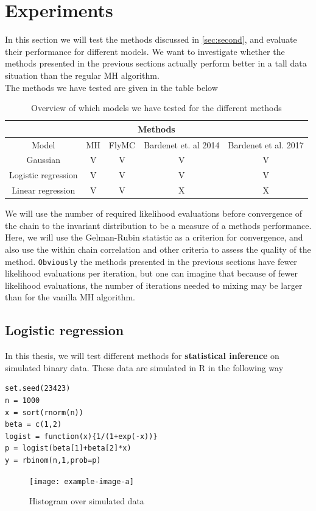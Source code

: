 \chapter{Experiments}\label{chap:experiments}
In this section we will test the methods discussed in \ref{sec:second}, and evaluate their performance for different models. We want to investigate whether the methods presented in the previous sections actually perform better in a tall data situation than the regular MH algorithm.  \\
The methods we have tested are given in the table below 

\begin{table}[H]
    \centering
        \begin{tabular}{|c|c|c|c|c|}
    \hline
    \multicolumn{5}{|c|}{Methods} \\
    \hline
   Model & MH & FlyMC & Bardenet et. al 2014 & Bardenet et al. 2017\\ \hline\hline
        Gaussian & V & V & V &V \\
        Logistic regression &V &V &V &V  \\
        Linear regression &V & V& X& X \\ \hline
    \end{tabular}{}
    \caption{Overview of which models we have tested for the different methods}
    \label{tab:experiment_overview}
\end{table}{}
We will use the number of required likelihood evaluations before convergence of the chain to the invariant distribution to be a measure of a methods performance.
Here, we will use the Gelman-Rubin statistic as a criterion for convergence, and also use the within chain correlation and other criteria to assess the quality of the method. 
\texttt{Obviously} the methods presented in the previous sections have fewer likelihood evaluations per iteration, but one can imagine that because of fewer likelihood evaluations, the number of iterations needed to mixing may be larger than for the vanilla MH algorithm. 


\section{Logistic regression}\label{subsec:data}
In this thesis, we will test different methods for \textbf{statistical inference} on simulated binary data. These data are simulated in R in the following way
\begin{lstlisting}[caption={simulation of binary data}, label={lst:simulation}]
set.seed(23423)
n = 1000
x = sort(rnorm(n))
beta = c(1,2)
logist = function(x){1/(1+exp(-x))}
p = logist(beta[1]+beta[2]*x)
y = rbinom(n,1,prob=p)
\end{lstlisting}
\begin{figure}
    \centering
    \texttt{[image: example-image-a]}
    \caption{Histogram over simulated data}
    \label{fig:my_label}
\end{figure}{}

